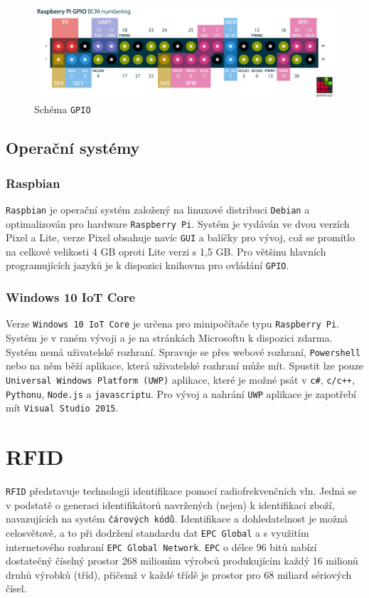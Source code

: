 \documentclass[czech,BP]{thesiskiv}
\begin{document}
		\begin{figure}[H]
   		 	\centering
			\includegraphics[width=1\textwidth]{../images/gpio.png}	
			\caption{Schéma \texttt{GPIO}}
    		\label{fig:gpio}
		\end{figure}		
		
		
		\subsection{Operační systémy}
			\subsubsection{Raspbian}
				\texttt{Raspbian} je operační systém založený na linuxové distribuci \texttt{Debian} a optimalizován pro hardware \texttt{Raspberry Pi}. Systém je vydáván ve dvou verzích Pixel a Lite, verze Pixel obsahuje navíc \texttt{GUI} a balíčky pro vývoj, což se promítlo na celkové velikosti 4 GB oproti Lite verzi s 1,5 GB. Pro většinu hlavních programujících jazyků je k dispozici knihovna pro ovládání \texttt{GPIO}.
			
			\subsubsection{Windows 10 IoT Core}
Verze \texttt{Windows 10 IoT Core} je určena pro minipočítače typu \texttt{Raspberry Pi}. Systém je v raném vývoji a je na stránkách Microsoftu k dispozici zdarma. Systém nemá uživatelské rozhraní. Spravuje se přes webové rozhraní, \texttt{Powershell} nebo na něm běží aplikace, která uživatelské rozhraní může mít. Spustit lze pouze \texttt{Universal Windows Platform (UWP)} aplikace, které je možné psát v \texttt{c\#}, \texttt{c/c++}, \texttt{Pythonu}, \texttt{Node.js} a \texttt{javascriptu}. Pro vývoj a nahrání \texttt{UWP} aplikace je zapotřebí mít \texttt{Visual Studio 2015}.
			
\section{RFID}
\texttt{RFID} představuje technologii identifikace pomocí radiofrekvenčních vln. Jedná se v podstatě o generaci identifikátorů navržených (nejen) k identifikaci zboží, navazujících na systém \texttt{čárových kódů}. Identifikace a dohledatelnost je možná celosvětově, a to při dodržení standardu dat \texttt{EPC Global} a s využitím internetového rozhraní \texttt{EPC Global Network}. \texttt{EPC} o délce 96 bitů nabízí dostatečný číselný prostor 268 milionům výrobců produkujícím každý 16 milionů druhů výrobků (tříd), přičemž v každé třídě je prostor pro 68 miliard sériových čísel.\cite{dolevcek2010identifikace}
\end{document}
